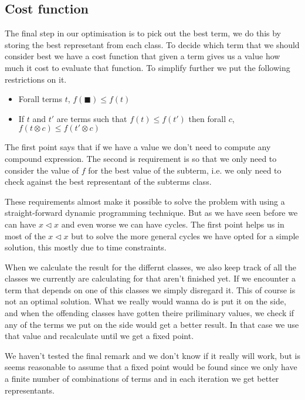 \subsection{Cost function}
The final step in our optimisation is to pick out the best term, we do this by
storing the best represetant from each class. To decide which term that we should
consider best we have a cost function that given a term gives us a value how
much it cost to evaluate that function. To simplify further we put the following
restrictions on it.

\begin{itemize}
  \item Forall terms $t$, $f(\blacksquare) \le f(t)$
  \item If $t$ and $t'$ are terms such that $f(t) \le f(t')$ then forall $c$,
         $f(t \otimes c) \le f(t' \otimes c)$
\end{itemize}

The first point says that if we have a value we don't need to compute any compound
expression. The second is requirement is so that we only need to consider the value
of $f$ for the best value of the subterm, i.e. we only need to check against the
best representant of the subterms class.

These requirements almost make it possible to solve the problem with using a 
straight-forward dynamic programming technique. But as we have seen before we can
have $x \lhd x$ and even worse we can have cycles. The first point helps us in most
of the $x \lhd x$ but to solve the more general cycles we have opted for a simple 
solution, this mostly due to time constraints.

When we calculate the result for the differnt classes, we also keep track of all
the classes we currently are calculating for that aren't finished yet. If we encounter
a term that depends on one of this classes we simply disregard it. This of course
is not an optimal solution. What we really would wanna do is put it on the side,
and when the offending classes have gotten theire priliminary values, we check if
any of the terms we put on the side would get a better result. In that case we use that
value and recalculate until we get a fixed point.

We haven't tested the final remark and we don't know if it really will work, but
is seems reasonable to assume that a fixed point would be found since we only have
a finite number of combinations of terms and in each iteration we get better representants.
